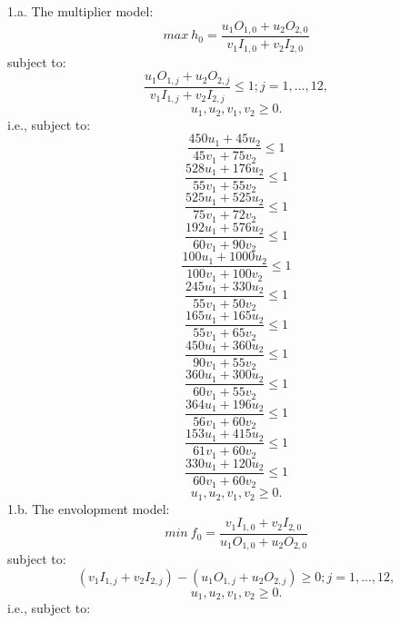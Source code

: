 \documentclass{article}
\begin{document}
1.a.
The multiplier model:
$$ max\ h_0 = \frac{u_1 O_{1,0} + u_2 O_{2,0}}{v_1 I_{1,0} + v_2 I_{2,0}} $$
subject to:
$$ \frac{u_1 O_{1,j} + u_2 O_{2,j}}{v_1 I_{1,j} + v_2 I_{2,j}} \leq 1; j = 1, ..., 12, $$
$$ u_1, u_2, v_1, v_2 \geq 0. $$
i.e., subject to:
$$ \frac{450 u_1 + 45 u_2}{45 v_1 + 75 v_2} \leq 1 $$
$$ \frac{528 u_1 + 176 u_2}{55 v_1 + 55 v_2} \leq 1 $$
$$ \frac{525 u_1 + 525 u_2}{75 v_1 + 72 v_2} \leq 1 $$
$$ \frac{192 u_1 + 576 u_2}{60 v_1 + 90 v_2} \leq 1 $$
$$ \frac{100 u_1 + 1000 u_2}{100 v_1 + 100 v_2} \leq 1 $$
$$ \frac{245 u_1 + 330 u_2}{55 v_1 + 50 v_2} \leq 1 $$
$$ \frac{165 u_1 + 165 u_2}{55 v_1 + 65 v_2} \leq 1 $$
$$ \frac{450 u_1 + 360 u_2}{90 v_1 + 55 v_2} \leq 1 $$
$$ \frac{360 u_1 + 300 u_2}{60 v_1 + 55 v_2} \leq 1 $$
$$ \frac{364 u_1 + 196 u_2}{56 v_1 + 60 v_2} \leq 1 $$
$$ \frac{153 u_1 + 415 u_2}{61 v_1 + 60 v_2} \leq 1 $$
$$ \frac{330 u_1 + 120 u_2}{60 v_1 + 60 v_2} \leq 1 $$
$$ u_1, u_2, v_1, v_2 \geq 0. $$
1.b.
The envolopment model:
$$ min\ f_0 = \frac{v_1 I_{1,0} + v_2 I_{2,0}}{u_1 O_{1,0} + u_2 O_{2,0}} $$
subject to:
$$ (v_1 I_{1,j} + v_2 I_{2,j}) - (u_1 O_{1,j} + u_2 O_{2,j}) \geq 0; j = 1, ..., 12, $$
$$ u_1, u_2, v_1, v_2 \geq 0. $$
i.e., subject to:
\end{document}
